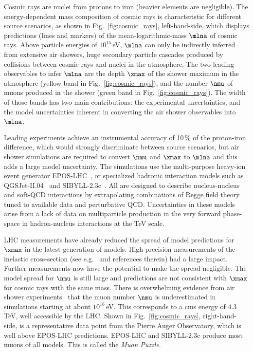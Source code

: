 \documentclass[../report.tex]{subfiles}
\begin{document}
Cosmic rays are nuclei from protons to iron (heavier elements are negligible). The energy-dependent mass composition of cosmic rays is characteristic for different source scenarios, as shown in Fig.~\ref{fig:cosmic_rays}, left-hand-side, which displays predictions (lines and markers) of the mean-logarithmic-mass $\mlna$ of cosmic rays. Above particle energies of $10^{15}$\,\si{eV}, $\mlna$ can only be indirectly inferred from extensive air showers, huge secondary particle cascades produced by collisions between cosmic rays and nuclei in the atmosphere. The two leading observables to infer $\mlna$ are the depth $\xmax$ of the shower maximum in the atmosphere (yellow band in Fig.~\ref{fig:cosmic_rays}), and the number $\nmu$ of muons produced in the shower (green band in Fig.~\ref{fig:cosmic_rays}). The width of those bands has two main contributions: the experimental uncertainties, and the model uncertainties inherent in converting the air shower observables into $\mlna$.

Leading experiments achieve an instrumental accuracy of 10\,\% of the proton-iron difference, which would strongly discriminate between source scenarios, but air shower simulations are required to convert $\nmu$ and $\xmax$ to $\mlna$ and this adds a large model uncertainty. The simulations use the multi-purpose heavy-ion event generator EPOS-LHC~\cite{Werner:2005jf}, or specialized hadronic interaction models such as \mbox{QGSJet-II.04}~\cite{Ostapchenko:2010vb} and SIBYLL-2.3c~\cite{Riehn:2017mfm}. All are designed to describe nucleus-nucleus and soft-QCD interactions by extrapolating combinations of Regge field theory tuned to available data and perturbative QCD. Uncertainties in these models arise from a lack of data on multiparticle production in the very forward phase-space in hadron-nucleus interactions at the TeV scale.

LHC measurements have already reduced the spread of model predictions for $\xmax$ in the latest generation of models. High-precision measurements of the inelastic cross-section (see e.g.~\cite{Aaij:2018okq} and references therein) had a large impact. Further measurements now have the potential to make the spread negligible. The model spread for $\nmu$ is still large and predictions are not consistent with $\xmax$ for cosmic rays with the same mass. There is overwhelming evidence from air shower experiments~\cite{Dembinski:2018UHECR,Aab:2014pza,Dembinski:2017zkb,Kokoulin:2009zz,Abbasi:2018fkz} that the muon number $\nmu$ is underestimated in simulations starting at about $10^{16}$\,eV. This corresponds to a cms energy of $4.3$\,TeV, well accessible by the LHC. Shown in Fig.~\ref{fig:cosmic_rays}, right-hand-side, is a representative data point from the Pierre Auger Observatory, which is well above EPOS-LHC predictions. EPOS-LHC and SIBYLL-2.3c produce most muons of all models. This is called the \emph{Muon Puzzle}.
\end{document}
